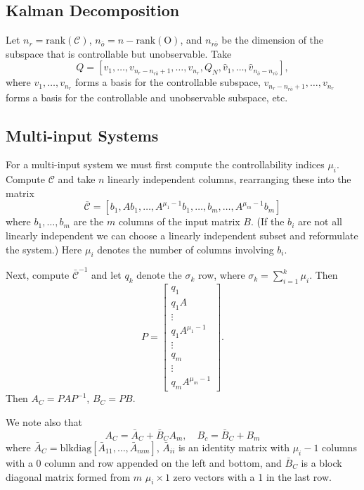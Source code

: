 \documentclass{report}
\begin{document}
\subsection{Kalman Decomposition}

Let $n_r = \mathrm{rank}(\mathcal{C})$,
$n_{\bar{o}} = n - \mathrm{rank}(\mathrm{O})$, and $n_{r\bar{o}}$ be the dimension
of the subspace that is controllable but unobservable. Take
$$
Q = [v_1, \dots, v_{n_r - n_{r\bar{o}} + 1}, \dots, v_{n_r}, Q_N,
     \hat{v}_1, \dots, \hat{v}_{n_{\bar{o}} - n_{r \bar{o}}}],
$$
where $v_1, \dots, v_{n_r}$ forms a basis for the controllable subspace,
$v_{n_r - n_{r\bar{o}} + 1}, \dots, v_{n_r}$ forms a basis for the
controllable and unobservable subspace, etc. %

\subsection{Multi-input Systems}
For a multi-input system we must first compute the controllability
indices $\mu_i$. Compute $\mathcal{C}$ and take $n$ linearly independent
columns, rearranging these into the matrix
$$
\bar{\mathcal{C}} =
\left[
  b_1, A b_1, \dots, A^{\mu_1 - 1} b_1,
  \dots,
  b_m, \dots, A^{\mu_m - 1} b_m
\right]
$$
where $b_1, \dots, b_m$ are the $m$ columns of the input matrix $B$.
(If the $b_i$ are not all linearly independent we can choose a
linearly independent subset and reformulate the system.)
Here $\mu_i$ denotes the number of columns involving $b_i$.

Next, compute $\bar{\mathcal{C}}^{-1}$ and let $q_k$ denote the $\sigma_k$
row, where $\sigma_k = \sum_{i=1}^k \mu_i$. Then
$$
P =
\left[\begin{array}{c}
  q_1            \\
  q_1 A          \\
  \vdots         \\
  q_1 A^{\mu_1 - 1} \\
  \vdots         \\
  q_m            \\
  \vdots         \\
  q_m A^{\mu_m - 1}
\end{array}\right].
$$
Then $A_C = P A P^{-1}$, $B_C = P B$.

We note also that
$$
A_C = \bar{A}_C + \bar{B}_C A_m, \quad
B_c = \bar{B}_C + B_m
$$
where $\bar{A}_C = \mathrm{blkdiag}[\bar{A}_{11}, \dots,
\bar{A}_{mm}]$, $\bar{A}_{ii}$ is an identity matrix with $\mu_i - 1$
columns with a 0 column and row appended on the left and bottom, and
$\bar{B}_C$ is a block diagonal matrix formed from $m$ $\mu_i \times 1$
zero vectors with a 1 in the last row.
\end{document}

